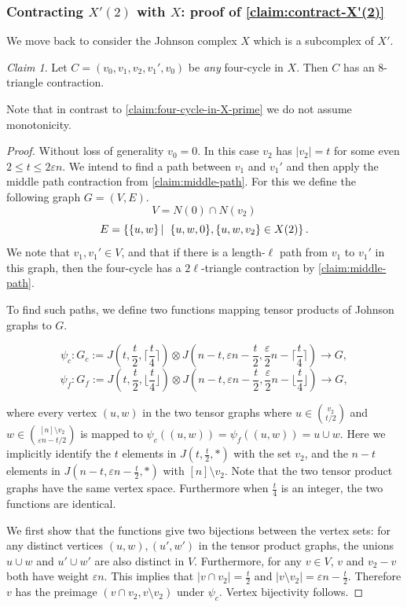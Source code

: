\documentclass[10pt,a4paper]{article}
\newcommand{\prettyref}[1]{\cref{#1}}
\theoremstyle{definition}
\theoremstyle{remark}
\newtheorem{claim}[theorem]{Claim}
\newcommand{\abs}[1]{\lvert#1\rvert}
\newcommand\sett[2]{\left\{ #1 \left| \; \vphantom{#1 #2} \right. #2  \right\}}
\newcommand{\set}[1]{\{#1\}}
\renewcommand{\leq}{\leqslant}
\numberwithin{equation}{section}
\let\pref=\prettyref
\newcommand{\fl}[1]{\lfloor #1 \rfloor}
\newcommand{\ceil}[1]{\lceil #1 \rceil}
\begin{document}
\subsubsection[Contracting X'(2) with X]{Contracting \(X'(2)\) with \(X\): proof of \pref{claim:contract-X'(2)} }\label{sec:contracting-X(2)}
We move back to consider the Johnson complex $X$ which is a subcomplex of $X'$. 

\begin{claim} \label{claim:four-cycle-in-X}
    Let \(C=(v_0,v_1,v_2,v_1',v_0)\) be \textit{any} four-cycle in \(X\). Then \(C\) has an \(8\)-triangle contraction.
\end{claim}
Note that in contrast to \pref{claim:four-cycle-in-X-prime} we do not assume monotonicity.

\begin{proof}
    Without loss of generality \(v_0=0\). In this case \(v_2\) has \(\abs{v_2} = t\) for some even \(2 \leq t \leq 2\varepsilon n\).
    We intend to find a path between $v_1$ and $v_1'$ and then apply the middle path contraction from \pref{claim:middle-path}. For this we define the following graph \(G=(V,E)\).
    \[V = N(0) \cap N(v_2)\]
    \[E = \sett{\set{u,w}}{\set{u,w,0}, \set{u,w,v_2} \in X(2)}.\]
    We note that $v_1,  v_1'\in V$, and that if there is a length-$\ell$ path from \(v_1\) to \(v_1'\) in this graph, then the four-cycle has a $2\ell$-triangle contraction by \pref{claim:middle-path}.
    
    To find such paths, we define two functions mapping tensor products of Johnson graphs to $G$.
    
    \[\psi_c : G_c := J(t,\frac{t}{2},\ceil{\frac{t}{4}}) \otimes J(n-t, \varepsilon n - \frac{t}{2}, \frac{\varepsilon}{2}n -\ceil{\frac{t}{4}}) \to G,\]
    \[\psi_f : G_f :=J(t,\frac{t}{2},\fl{\frac{t}{4}}) \otimes J(n-t, \varepsilon n - \frac{t}{2}, \frac{\varepsilon}{2}n - \fl{\frac{t}{4}}) \to G,\]
    
    where every vertex $(u,w)$ in the two tensor graphs where $u\in \binom{v_2}{t/2}$ and $w \in \binom{[n]\setminus v_2}{\varepsilon n - t/2}$ is mapped to $\psi_c((u,w)) = \psi_f((u,w)) = u\cup w$. Here we implicitly identify the $t$ elements in $J(t,\frac{t}{2},*)$ with the set $v_2$, and the $n-t$ elements in $J(n-t, \varepsilon n - \frac{t}{2}, *)$  with $[n]\setminus v_2$.
    Note that the two tensor product graphs have the same vertex space.
    Furthermore when $\frac{t}{4}$ is an integer, the two functions are identical.

    We first show that the functions give two bijections between the vertex sets: for any distinct vertices $(u,w),(u',w')$ in the tensor product graphs, the unions $u\cup w$ and $u'\cup w'$ are also distinct in $V$. Furthermore, for any \(v \in V\), \(v\) and \(v_2-v\) both have weight \(\varepsilon n\). This implies that \(\abs{v \cap v_2} = \frac{t}{2}\) and \(\abs{v \setminus v_2} = \varepsilon n - \frac{t}{2}\).  Therefore $v$ has the preimage $(v \cap v_2,  v \setminus v_2)$ under $\psi_c$.
    Vertex bijectivity follows. 


\end{proof}
\end{document}
